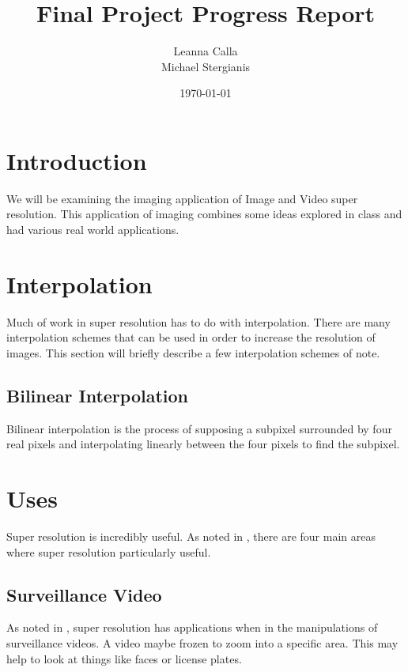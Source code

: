 \documentclass{article}
\title{Final Project Progress Report}
\author{Leanna Calla\\Michael Stergianis}
\date{\today}
\begin{document}
\maketitle

\section{Introduction}
We will be examining the imaging application of Image and Video super
resolution. This application of imaging combines some ideas explored
in class and had various real world applications. 
\section{Interpolation}
\label{sec:interpolation}
Much of work in super resolution has to do with interpolation.  There
are many interpolation schemes that can be used in order to increase
the resolution of images. This section will briefly describe a few
interpolation schemes of note.
%
\subsection{Bilinear Interpolation}
\label{subsec:bilinear}
Bilinear interpolation is the process of supposing a subpixel
surrounded by four real pixels and interpolating linearly between the
four pixels to find the subpixel.
%
%
\section{Uses}
\label{sec:uses}

Super resolution is incredibly useful. As noted in
\cite{Yang2010ImageSH}, there are four main areas where super
resolution particularly useful.
\subsection{Surveillance Video}
As noted in \cite{Yang2010ImageSH}, super resolution has applications
when in the manipulations of surveillance videos. A video maybe frozen
to zoom into a specific area. This may help to look at things like faces or license plates.
\end{document}
